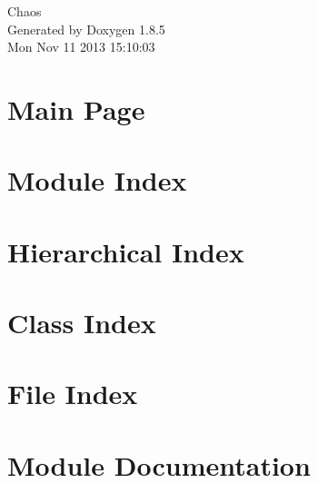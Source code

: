 \documentclass[twoside]{book}
\newcommand{\clearemptydoublepage}{%
  \newpage{\pagestyle{empty}\cleardoublepage}%
}
\begin{document}
\hypersetup{pageanchor=false}
\begin{titlepage}
\vspace*{7cm}
\begin{center}%
{\Large Chaos }\\
\vspace*{1cm}
{\large Generated by Doxygen 1.8.5}\\
\vspace*{0.5cm}
{\small Mon Nov 11 2013 15:10:03}\\
\end{center}
\end{titlepage}
\clearemptydoublepage
\tableofcontents
\clearemptydoublepage
{}
\hypersetup{pageanchor=true}

\chapter{Main Page}
\label{index}\hypertarget{index}{}
\chapter{Module Index}

\chapter{Hierarchical Index}

\chapter{Class Index}

\chapter{File Index}

\chapter{Module Documentation}


































\end{document}
